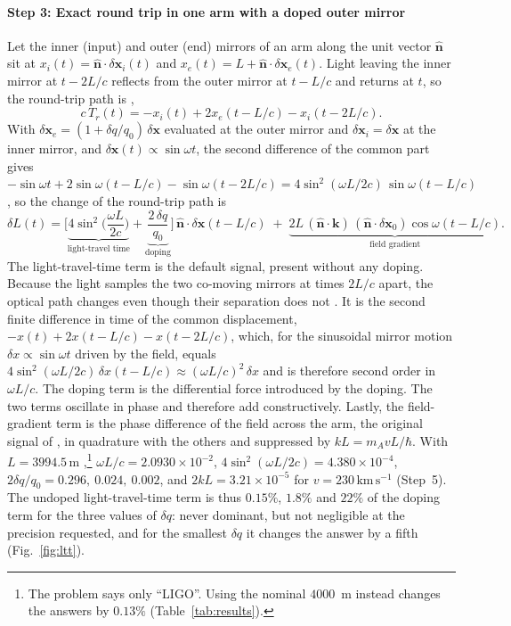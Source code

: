 \paragraph*{Step 3: Exact round trip in one arm with a doped outer mirror}
Let the inner (input) and outer (end) mirrors of an arm along the unit vector $\hat{\mathbf n}$ sit at $x_i(t)=\hat{\mathbf n}\cdot\delta\mathbf x_i(t)$ and $x_e(t)=L+\hat{\mathbf n}\cdot\delta\mathbf x_e(t)$. Light leaving the inner mirror at $t-2L/c$ reflects from the outer mirror at $t-L/c$ and returns at $t$, so the round-trip path is \citep[Eq.~11]{Morisaki2021}, \citep[Eq.~9]{Michimura2020}
%
\begin{equation}
c\,T_r(t)=-x_i(t)+2x_e(t-L/c)-x_i(t-2L/c).
\label{eq:roundtrip}
\end{equation}
%
With $\delta\mathbf x_e=(1+\delta q/q_0)\,\delta\mathbf x$ evaluated at the outer mirror and $\delta\mathbf x_i=\delta\mathbf x$ at the inner mirror, and $\delta\mathbf x(t)\propto\sin\omega t$, the second difference of the common part gives $-\sin\omega t+2\sin\omega(t-L/c)-\sin\omega(t-2L/c)=4\sin^2(\omega L/2c)\,\sin\omega(t-L/c)$, so the change of the round-trip path is
%
\begin{equation}
\delta L(t)=\Big[\underbrace{4\sin^2\!\Big(\frac{\omega L}{2c}\Big)}_{\text{light-travel time}}+\underbrace{\frac{2\,\delta q}{q_0}}_{\text{doping}}\Big]\,\hat{\mathbf n}\cdot\delta\mathbf x(t-L/c)\;+\;\underbrace{2L\,(\hat{\mathbf n}\cdot\mathbf k)\,(\hat{\mathbf n}\cdot\delta\mathbf x_0)\cos\omega(t-L/c)}_{\text{field gradient}} .
\label{eq:dL}
\end{equation}
%
The light-travel-time term is the default signal, present without any doping. Because the light samples the two co-moving mirrors at times $2L/c$ apart, the optical path changes even though their separation does not \citep{Morisaki2021}. It is the second finite difference in time of the common displacement, $-x(t)+2x(t-L/c)-x(t-2L/c)$, which, for the sinusoidal mirror motion $\delta x\propto\sin\omega t$ driven by the field, equals $4\sin^2(\omega L/2c)\,\delta x(t-L/c)\approx(\omega L/c)^2\,\delta x$ and is therefore second order in $\omega L/c$. The doping term is the differential force introduced by the doping. The two terms oscillate in phase and therefore add constructively. Lastly, the field-gradient term is the phase difference of the field across the arm, the original signal of \citet{Pierce2018}, in quadrature with the others and suppressed by $kL=m_AvL/\hbar$. With $L=3994.5\,\mathrm{m}$ \citep{Aasi2015},\footnote{The problem says only ``LIGO''. Using the nominal $4000$~m instead changes the answers by $0.13\%$ (Table~\ref{tab:results}).} $\omega L/c=2.0930\times10^{-2}$, $4\sin^2(\omega L/2c)=4.380\times10^{-4}$, $2\delta q/q_0=0.296,\ 0.024,\ 0.002$, and $2kL=3.21\times10^{-5}$ for $v=230\,\mathrm{km\,s^{-1}}$ (Step~5). The undoped light-travel-time term is thus $0.15\%$, $1.8\%$ and $22\%$ of the doping term for the three values of $\delta q$: never dominant, but not negligible at the precision requested, and for the smallest $\delta q$ it changes the answer by a fifth (Fig.~\ref{fig:ltt}).

